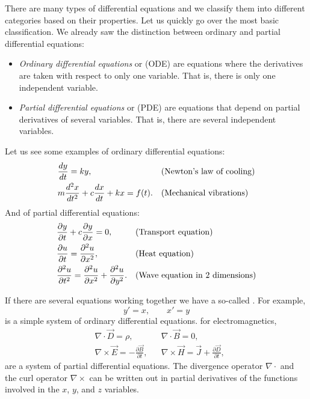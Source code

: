 There are many types of differential equations and we classify them into
different categories based on their properties.  Let us quickly go over
the most basic classification.  We already saw the distinction
between ordinary and partial differential equations:
\begin{itemize}
\item
\emph{Ordinary differential equations}
 or (ODE) are
equations where the derivatives are taken with respect to only one variable.
That is, there is only one independent variable.
\item
\emph{Partial differential equations}
 or (PDE) are
equations that depend on partial derivatives of several variables.
That is, there are several independent variables.
\end{itemize}

Let us see some examples of ordinary differential equations:
\begin{align*}
& \frac{d y}{dt} = ky , & & \text{(\myindex{Newton's law of cooling})} \\
& m \frac{d^2 x}{dt^2} + c \frac{dx}{dt} + kx = f(t) . & &
\text{(Mechanical vibrations\index{mechanical vibrations})}
\end{align*}
And of partial differential equations:
\begin{align*}
& \frac{\partial y}{\partial t} + c \frac{\partial y}{\partial x} = 0 , & & 
\text{(Transport equation\index{transport equation})} \\
& \frac{\partial u}{\partial t} = \frac{\partial^2 u}{\partial x^2} , & & 
\text{(Heat equation\index{heat equation})} \\
& \frac{\partial^2 u}{\partial t^2} = \frac{\partial^2 u}{\partial x^2} +
\frac{\partial^2 u}{\partial y^2} . & & 
\text{(Wave equation in 2 dimensions\index{wave equation in 2 dimensions})}
\end{align*}

If there are several equations working together we have a so-called
\emph{}.  For example,
\begin{equation*}
y' = x , \qquad x' = y
\end{equation*}
is a simple system of ordinary differential equations.
 for electromagnetics,
\begin{align*}
& \nabla \cdot \vec{D} = \rho, & & \nabla \cdot \vec{B} = 0 , \\
& \nabla \times \vec{E} = - \frac{\partial \vec{B}}{\partial t}, &
& \nabla \times \vec{H} = \vec{J} + \frac{\partial \vec{D}}{\partial t} ,
\end{align*}
are a system of partial differential equations. 
The divergence operator $\nabla \cdot$ and the
curl operator $\nabla \times$ can be written out in partial derivatives of
the functions involved in the $x$, $y$, and $z$ variables.

